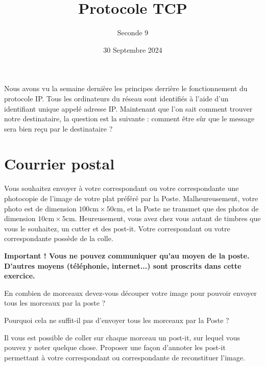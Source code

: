 \documentclass{article}
\title{Protocole TCP}
\date{30 Septembre 2024}
\author{Seconde 9}
\begin{document}
\maketitle

\begin{tcolorbox}
Nous avons vu la semaine dernière les principes derrière le fonctionnement du protocole IP. Tous les ordinateurs du réseau sont identifiés à l'aide d'un identifiant unique appelé adresse IP. Maintenant que l'on sait comment trouver notre destinataire, la question est la suivante : comment être sûr que le message sera bien reçu par le destinataire ?
\end{tcolorbox}

\section{Courrier postal}
Vous souhaitez envoyer à votre correspondant ou votre correspondante une photocopie de l'image de votre plat préféré par la Poste. Malheureusement, votre photo est de dimension $100 \unit{\centi\meter} \times 50 \unit{\centi\meter}$, et la Poste ne transmet que des photos de dimension $10 \unit{\centi\meter} \times 5 \unit{\centi\meter}$. Heureusement, vous avez chez vous autant de timbres que vous le souhaitez, un cutter et des post-it. Votre correspondant ou votre correspondante possède de la colle.

\textbf{Important ! Vous ne pouvez communiquer qu'au moyen de la poste. D'autres moyens (téléphonie, internet...) sont proscrits dans cette exercice.} 

\begin{enumquestions}
\item En combien de morceaux devez-vous découper votre image pour pouvoir envoyer tous les morceaux par la poste ?
\item Pourquoi cela ne suffit-il pas d'envoyer tous les morceaux par la Poste ?
\item Il vous est possible de coller sur chaque morceau un post-it, sur lequel vous pouvez y noter quelque chose. Proposer une façon d'annoter les post-it permettant à votre correspondant ou correspondante de reconstituer l'image.
\end{enumquestions}
\vspace*{0.5cm}
\emptybox{11cm}
\end{document}
